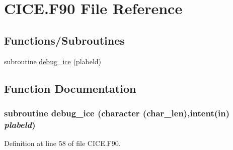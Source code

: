 \hypertarget{CICE_8F90}{
\section{CICE.F90 File Reference}
\label{CICE_8F90}
}
\subsection*{Functions/Subroutines}
\begin{DoxyCompactItemize}
\item 
subroutine \hyperlink{CICE_8F90_a39fddf1bf32861ff4c93670cf55cfffe}{debug\_\-ice} (plabeld)
\end{DoxyCompactItemize}


\subsection{Function Documentation}
\hypertarget{CICE_8F90_a39fddf1bf32861ff4c93670cf55cfffe}{
\subsubsection[{debug\_\-ice}]{\setlength{\rightskip}{0pt plus 5cm}subroutine debug\_\-ice (character (char\_\-len),intent(in) {\em plabeld})}}
\label{CICE_8F90_a39fddf1bf32861ff4c93670cf55cfffe}


Definition at line 58 of file CICE.F90.
